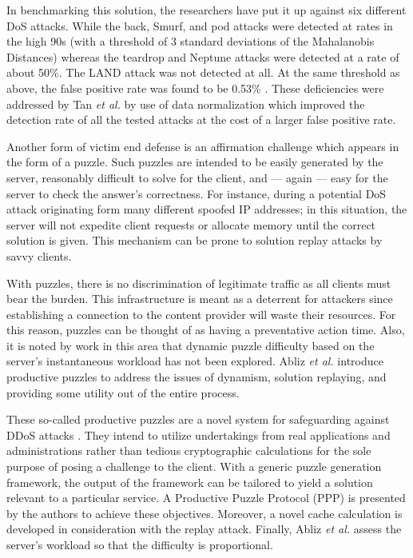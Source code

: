 \documentclass[conference]{IEEEtran}
\begin{document}
In benchmarking this solution, the researchers have put it up against six different DoS attacks. While the back, Smurf, and pod attacks were detected at rates in the high 90s (with a threshold of 3 standard deviations of the Mahalanobis Distances) whereas the teardrop and Neptune attacks were detected at a rate of about 50\%. The LAND attack was not detected at all. At the same threshold as above, the false positive rate was found to be 0.53\% \cite{Tan:MCA}. These deficiencies were addressed by Tan \textit{et al.} by use of data normalization which improved the detection rate of all the tested attacks at the cost of a larger false positive rate.  

Another form of victim end defense is an affirmation challenge which appears in the form of a puzzle. Such puzzles are intended to be easily generated by the server, reasonably difficult to solve for the client, and --- again --- easy for the server to check the answer's correctness. For instance, during a potential DoS attack originating form many different spoofed IP addresses; in this situation, the server will not expedite client requests or allocate memory until the correct solution is given. This mechanism can be prone to solution replay attacks by savvy clients.

With puzzles, there is no discrimination of legitimate traffic as all clients must bear the burden. This infrastructure is meant as a deterrent for attackers since establishing a connection to the content provider will waste their resources. For this reason, puzzles can be thought of as having a preventative action time. Also, it is noted by work in this area that dynamic puzzle difficulty based on the server's instantaneous workload has not been explored. Abliz \textit{et al.} introduce productive puzzles to address the issues of dynamism, solution replaying, and providing some utility out of the entire process. 

These so-called productive puzzles are a novel system for safeguarding against DDoS attacks \cite{Abliz:Puzz}. They intend to utilize undertakings from real applications and administrations rather than tedious cryptographic calculations for the sole purpose of posing a challenge to the client. With a generic puzzle generation framework, the output of the framework can be tailored to yield a solution relevant to a particular service. A Productive Puzzle Protocol (PPP) is presented by the authors to achieve these objectives. Moreover, a novel cache calculation is developed in consideration with the replay attack. Finally, Abliz \textit{et al.} assess the server's workload so that the difficulty is proportional. 
\end{document}
